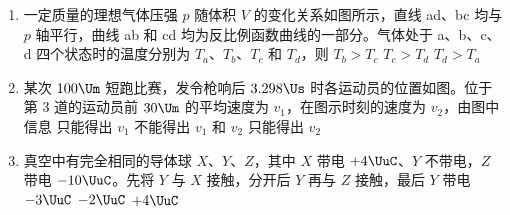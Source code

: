 \documentclass[\gkver]{gaokaozhenti}
\begin{document}
\begin{enumerate}
{三块碎片在同一高度 $h$ 以相同的速率 $v_{0}$ 飞出，只有重力做功，机械能守恒，对每一块都有

$\frac{1}{2}mv^{2} = \frac{1}{2}mv_{0}^{2} + mgh$

得 $v = \sqrt{v_{0}^{2} + 2gh}$，与质量和抛出方向都无关，所以三者落地时速率一样大。

故选 D。
}

\item
一定质量的理想气体压强 $p$ 随体积 $V$ 的变化关系如图所示，直线 ad、bc 均与 $p$ 轴平行，曲线 ab 和 cd 均为反比例函数曲线的一部分。气体处于 a、b、c、d 四个状态时的温度分别为 $T_{a}$、$T_{b}$、$T_{c}$ 和 $T_{d}$，则
\onepicture[w=4.5cm, align=right]{}
{$T_{b} > T_{c}$}
{$T_{c} > T_{d}$}
{$T_{d} > T_{a}$}

\item
某次 $100 \Um$ 短跑比赛，发令枪响后 $3.298 \Us$ 时各运动员的位置如图。位于第 3 道的运动员前 $30 \Um$ 的平均速度为 $v_{1}$，在图示时刻的速度为 $v_{2}$，由图中信息
\onepicture[w=9cm, align=right]{}
{只能得出 $v_{1}$}
{不能得出 $v_{1}$ 和 $v_{2}$}
{只能得出 $v_{2}$}

\item
真空中有完全相同的导体球 $X$、$Y$、$Z$，其中 $X$ 带电 $+4 \UuC$、$Y$ 不带电，$Z$ 带电 $-10 \UuC$。先将 $Y$ 与 $X$ 接触，分开后 $Y$ 再与 $Z$ 接触，最后 $Y$ 带电
\fourchoices[answer=A]
{$-4 \UuC$}
{$-3 \UuC$}
{$-2 \UuC$}
{$+4 \UuC$}
\end{enumerate}
\end{document}
